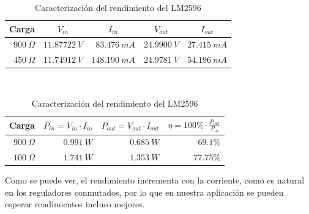 \begin{table}[H]
    \centering
    \begin{subtable}[t]{\textwidth}
        \centering
        \begin{tabular}{rrrrr}
            \toprule
            \multicolumn{1}{c}{Carga} & \multicolumn{1}{c}{$V_{in}$} & \multicolumn{1}{c}{$I_{in}$} & \multicolumn{1}{c}{$V_{out}$} & \multicolumn{1}{c}{$I_{out}$}\\ \midrule
            $900\ \Omega$             & $11.87722\ V$                 & $83.476\ mA$                 & $24.9900\ V$                  & $27.415\ mA$                \\
            $450\ \Omega$             & $11.74912\ V$                 & $148.190\ mA$                & $24.9781\ V$                  & $54.196\ mA$                \\ \bottomrule
        \end{tabular}
        \caption{Medidas tomadas en laboratorio}
    \end{subtable}
    \\[0.5cm]
    \begin{subtable}[t]{\textwidth}
        \centering
        \begin{tabular}{rrrr}
            \toprule
            \multicolumn{1}{c}{Carga} & \multicolumn{1}{l}{$P_{in} = V_{in}\cdot I_{in}$} & \multicolumn{1}{l}{$P_{out} = V_{out}\cdot I_{out}$} & \multicolumn{1}{l}{$\eta = 100\%\cdot\frac{P_{out}}{P_{in}}$} \\ \midrule
            $900\ \Omega$             & $0.991\ W$                                     & $0.685\ W$                                        & $69.1\%$                                                    \\
            $100\ \Omega$             & $1.741\ W$                                    & $1.353\ W$                                       & $77.75\%$                                                    \\ \bottomrule
        \end{tabular}
        \caption{Cálculos de rendimiento realizados}
    \end{subtable}
    \caption{Caracterización del rendimiento del LM2596}
    \label{tab:rendimiento_elevador}
\end{table}

Como se puede ver, el rendimiento incrementa con la corriente, como es natural en los reguladores conmutados, por lo que en nuestra aplicación se pueden esperar rendimientos incluso mejores.